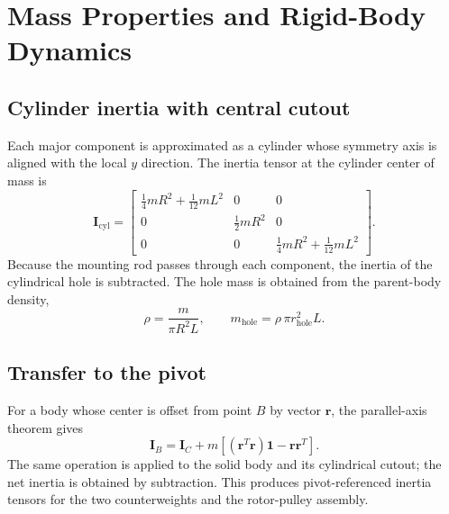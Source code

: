 \documentclass[11pt]{article}
\newcommand{\vect}[1]{\bm{#1}}
\newcommand{\mat}[1]{\bm{#1}}
\begin{document}
\section{Mass Properties and Rigid-Body Dynamics}
\subsection{Cylinder inertia with central cutout}
Each major component is approximated as a cylinder whose symmetry axis is aligned with the local $y$ direction. The inertia tensor at the cylinder center of mass is
\begin{equation}
\mat{I}_{\mathrm{cyl}}=
\begin{bmatrix}
\frac{1}{4}mR^2+\frac{1}{12}mL^2 & 0 & 0\\
0 & \frac{1}{2}mR^2 & 0\\
0 & 0 & \frac{1}{4}mR^2+\frac{1}{12}mL^2
\end{bmatrix}.
\end{equation}
Because the mounting rod passes through each component, the inertia of the cylindrical hole is subtracted. The hole mass is obtained from the parent-body density,
\begin{equation}
    \rho=\frac{m}{\pi R^2L}, \qquad
    m_{\mathrm{hole}}=\rho\,\pi r_{\mathrm{hole}}^2L.
\end{equation}

\subsection{Transfer to the pivot}
For a body whose center is offset from point $B$ by vector $\vect{r}$, the parallel-axis theorem gives
\begin{equation}
    \mat{I}_{B}=\mat{I}_{C}+m\left[(\vect{r}^{T}\vect{r})\mat{1}-\vect{r}\vect{r}^{T}\right].
\end{equation}
The same operation is applied to the solid body and its cylindrical cutout; the net inertia is obtained by subtraction. This produces pivot-referenced inertia tensors for the two counterweights and the rotor-pulley assembly.
\end{document}
